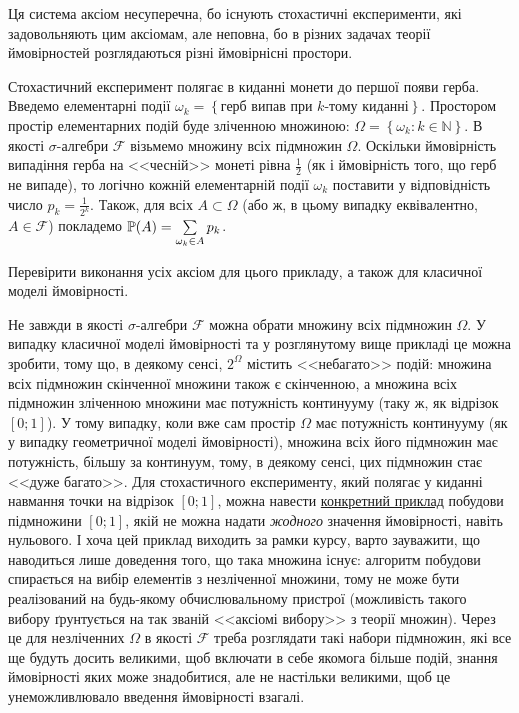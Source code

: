 Ця система аксіом несуперечна, бо існують стохастичні експерименти,
які задовольняють цим аксіомам, але неповна, бо в різних задачах
теорії ймовірностей розглядаються різні ймовірнісні простори.

\begin{example}
    Стохастичний експеримент полягає в киданні монети до першої появи герба. Введемо елементарні події $\omega_k = \left\{ 
        \text{герб випав при } k \text{-тому киданні}
    \right\}$. Простором простір елементарних подій буде зліченною множиною:
    $\Omega = \left\{\omega_k : k \in \mathbb{N} \right\}$. В якості $\sigma$-алгебри $\mathcal{F}$ візьмемо множину всіх підмножин $\Omega$.
    Оскільки ймовірність випадіння герба на <<чесній>> монеті рівна $\frac{1}{2}$ (як і ймовірність того, що герб не випаде), то логічно кожній елементарній події $\omega_k$ поставити 
    у відповідність число $p_k = \frac{1}{2^k}$. Також, для всіх $A \subset \Omega$ (або ж, в цьому випадку еквівалентно, $A \in \mathcal{F}$) покладемо
    $\P(A) = \sum\limits_{\omega_k \in A} p_k$.
\end{example}

\begin{exercise}
    Перевірити виконання усіх аксіом для цього прикладу, а також для класичної моделі ймовірності.
\end{exercise}

\begin{remark}
    Не завжди в якості $\sigma$-алгебри $\mathcal{F}$ можна обрати множину всіх підмножин $\Omega$. 
    У випадку класичної моделі ймовірності та у розглянутому вище прикладі
    це можна зробити, тому що, в деякому сенсі, $2^{\Omega}$ містить <<небагато>> подій: множина всіх підмножин скінченної множини також
    є скінченною, а множина всіх підмножин зліченною множини має потужність континууму (таку ж, як відрізок $[0; 1]$).
    У тому випадку, коли вже сам простір $\Omega$ має потужність континууму (як у випадку геометричної моделі ймовірності),
    множина всіх його підмножин має потужність, більшу за континуум, тому, в деякому сенсі, цих підмножин стає <<дуже багато>>.
    Для стохастичного експерименту, який полягає у киданні навмання точки на відрізок $[0; 1]$,
    можна навести \href{https://uk.wikipedia.org/wiki/%D0%9C%D0%BD%D0%BE%D0%B6%D0%B8%D0%BD%D0%B0_%D0%92%D1%96%D1%82%D0%B0%D0%BB%D1%96}{конкретний приклад}
    побудови підмножини $[0; 1]$, якій не можна надати \emph{жодного} значення ймовірності, навіть нульового.
    І хоча цей приклад виходить за рамки курсу, варто зауважити, що наводиться лише доведення того, що така множина існує:
    алгоритм побудови спирається на вибір елементів з незліченної множини, тому не може бути реалізований на будь-якому обчислювальному пристрої
    (можливість такого вибору ґрунтується на так званій <<аксіомі вибору>> з теорії множин).
    Через це для незліченних $\Omega$ в якості $\mathcal{F}$ треба розглядати такі набори підмножин, які все ще будуть досить великими,
    щоб включати в себе якомога більше подій, знання ймовірності яких може знадобитися, але не настільки великими, щоб це унеможливлювало введення ймовірності взагалі.
\end{remark}

